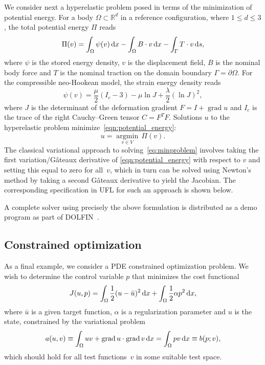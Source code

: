 \documentclass[prodmode,acmtoms]{acmsmall}
\DeclareMathOperator{\Grad}{grad}
\newcommand{\Gateaux}{G\^ateaux}
\newcommand{\dx}{\dif{}x}
\newcommand{\ds}{\dif{}s}
\begin{document}
We consider next a hyperelastic problem posed in terms of the
minimization of potential energy. For a body $\Omega \subset
\mathbb{R}^{d}$ in a reference configuration, where $1 \le d \le 3$,
the total potential energy $\Pi$ reads
\begin{equation}
  \Pi(v) = \int_{\Omega} \psi(v) \dx - \int_{\Omega} B \cdot v \dx
  - \int_{\Gamma} T \cdot  v \ds,
\label{eqn:potential_energy}
\end{equation}
where $\psi$ is the stored energy density, $v$ is the displacement
field, $B$ is the nominal body force and $T$ is the nominal traction
on the domain boundary $\Gamma = \partial \Omega$. For the
compressible neo-Hookean model, the strain energy density reads
\begin{equation}
  \psi(v) =
  \frac{\mu}{2}(I_c - 3) - \mu\ln J + \frac{\lambda}{2}(\ln J)^2,
\end{equation}
where $J$ is the determinant of the deformation gradient $F = I +
\Grad u$ and $I_c$ is the trace of the right Cauchy--Green tensor $C =
F^{T}F$. Solutions $u$ to the hyperelastic problem
minimize~\eqref{eqn:potential_energy}:
\begin{equation} \label{eq:minproblem}
  u = \underset{v \in V}{\operatorname{argmin}} \, \Pi(v).
\end{equation}
The classical variational approach to solving~\eqref{eq:minproblem}
involves taking the first variation/\Gateaux{} derivative of
\eqref{eqn:potential_energy} with respect to $v$ and setting this equal
to zero for all~$v$, which in turn can be solved using Newton's method
by taking a second \Gateaux{} derivative to yield the Jacobian.  The
corresponding specification in UFL for such an approach is shown below.


A complete solver using precisely the above formulation is distributed
as a demo program as part of DOLFIN~\citep{logg:2010,dolfin:www}.

\subsection{Constrained optimization}

As a final example, we consider a PDE constrained optimization
problem. We wish to determine the control variable $p$ that minimizes
the cost functional
\begin{equation}
  J(u, p) =
  \int_\Omega \frac{1}{2}(u - \bar{u})^2 \dx +
  \int_\Omega\frac{1}{2}\alpha p^2 \dx,
\end{equation}
where $\bar{u}$ is a given target function, $\alpha$ is a
regularization parameter and $u$ is the state, constrained by the
variational problem
\begin{equation}
  \label{eq:optimization,varproblem}
  a(u, v) \equiv \int_\Omega u v + \Grad u \cdot \Grad v \dx
  = \int_\Omega p v \dx \equiv b(p; v),
\end{equation}
which should hold for all test functions~$v$ in some suitable test space.
\end{document}
